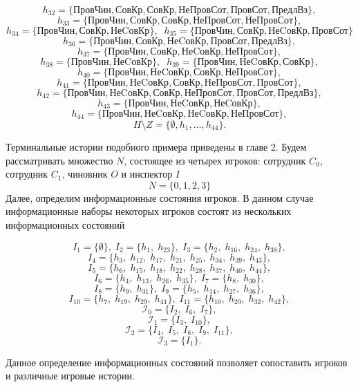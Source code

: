 $$	h_{32} = \{\text{ПровЧин}, \text{СовКр}, \text{СовКр}, \text{НеПровСот}, \text{ПровСот}, \text{ПредлВз}\}, $$
$$	h_{33} = \{\text{ПровЧин}, \text{СовКр}, \text{СовКр}, \text{НеПровСот}, \text{НеПровСот}\}, $$
$$	h_{34} = \{\text{ПровЧин}, \text{СовКр}, \text{НеCовКр}\},\;\;h_{35} = \{\text{ПровЧин}, \text{СовКр}, \text{НеCовКр}, \text{ПровСот}\} $$
$$	h_{36} = \{\text{ПровЧин}, \text{СовКр}, \text{НеCовКр}, \text{ПровСот}, \text{ПредлВз}\}, $$
$$	h_{37} = \{\text{ПровЧин}, \text{СовКр}, \text{НеCовКр}, \text{НеПровСот}\}, $$
$$	h_{38} = \{\text{ПровЧин}, \text{НеCовКр}\},\;\;h_{39} = \{\text{ПровЧин}, \text{НеCовКр}, \text{СовКр}\}, $$
$$	h_{40} = \{\text{ПровЧин}, \text{НеCовКр}, \text{СовКр}, \text{НеПровСот}\}, $$
$$	h_{41} = \{\text{ПровЧин}, \text{НеCовКр}, \text{СовКр}, \text{НеПровСот}, \text{ПровСот}\}, $$
$$	h_{42} = \{\text{ПровЧин}, \text{НеCовКр}, \text{СовКр}, \text{НеПровСот}, \text{ПровСот}, \text{ПредлВз}\}, $$
$$	h_{43} = \{\text{ПровЧин}, \text{НеCовКр}, \text{НеCовКр}\}, $$
$$	h_{44} = \{\text{ПровЧин}, \text{НеCовКр}, \text{НеCовКр}, \text{НеПровСот}\}, $$
\begin{equation}
	\label{HmZ2}
	H \setminus Z = \{\emptyset, h_{1}, \dots , h_{44}\}.
\end{equation}

\par
Терминальные истории подобного примера приведены в главе 2. Будем рассматривать множество $N$, состоящее из четырех игроков: сотрудник $C_0$, сотрудник $C_1$, чиновник $O$ и инспектор $I$
\begin{equation*}
	N = \{0, 1, 2, 3\}
\end{equation*}
Далее, определим информационные состояния игроков. В данном случае информационные наборы некоторых игроков состоят из нескольких информационных состояний

 $$	I_1 = \{\emptyset\},\; I_2 = \{h_{1},\; h_{23}\},\;	I_3 = \{h_{2},\; h_{16},\; h_{24},\; h_{38}\},  $$
 $$	I_4 = \{h_{3},\;h_{12},\;h_{17},\;h_{21},\;h_{25},\;h_{34},\;h_{39},\;h_{43}\}, $$
 $$	I_5 = \{h_{6},\;h_{15},\;h_{18},\;h_{22},\;h_{28},\;h_{37},\;h_{40},\;h_{44}\}, $$
 $$	I_6 = \{h_{4},\;h_{13},\;h_{26},\;h_{35}\},\; I_7 = \{h_{8},\; h_{30}\},$$
 $$	I_8 = \{h_{9},\;h_{31}\},\;I_9 = \{h_{5},\;h_{14},\;h_{27},\;h_{36}\},  $$
 $$	I_{10} = \{h_{7},\;h_{19},\;h_{29},\;h_{41}\},\;I_{11} = \{h_{10},\;h_{20},\;h_{32},\;h_{42}\}, $$
 $$	\mathcal{I}_0 = \{I_2,\;I_6,\;I_7\},  $$
 $$	\mathcal{I}_1 = \{I_3,\;I_{10}\},  $$
 $$	\mathcal{I}_2 = \{I_4,\;I_5,\;I_8,\;I_9,\;I_{11}\},  $$
 $$	\mathcal{I}_3 = \{I_1\}. $$
\par
Данное определение информационных состояний позволяет сопоставить игроков и различные игровые истории.

